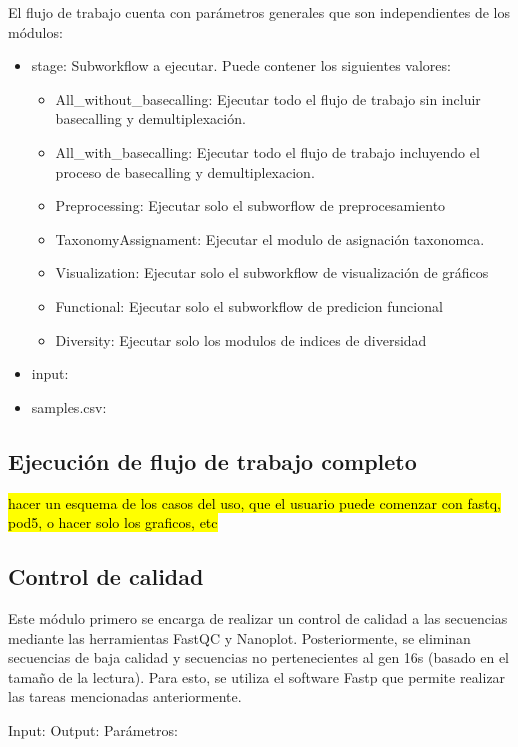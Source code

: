 El flujo de trabajo cuenta con parámetros generales que son independientes de los módulos:
\begin{itemize}
    \item stage: Subworkflow a ejecutar. Puede contener los siguientes valores:
          \begin{itemize}
              \item All\_without\_basecalling: Ejecutar todo el flujo de trabajo sin incluir basecalling y demultiplexación.
              \item All\_with\_basecalling: Ejecutar todo el flujo de trabajo incluyendo el proceso de basecalling y demultiplexacion.
              \item Preprocessing: Ejecutar solo el subworflow de preprocesamiento
              \item TaxonomyAssignament: Ejecutar el modulo de asignación taxonomca.
              \item Visualization: Ejecutar solo el subworkflow de visualización de gráficos
              \item Functional: Ejecutar solo el subworkflow de predicion funcional
              \item Diversity: Ejecutar solo los modulos de indices de diversidad

          \end{itemize}
    \item input:
    \item samples.csv:
\end{itemize}

\subsection{Ejecución de flujo de trabajo completo}
\hl{hacer un esquema de los casos del uso, que el usuario puede comenzar con fastq, pod5, o hacer solo los graficos, etc}
\subsection{Control de calidad}
Este módulo primero se encarga de realizar un control de calidad a las secuencias mediante las herramientas FastQC y Nanoplot.  Posteriormente, se eliminan secuencias de baja calidad y secuencias no pertenecientes al gen 16s (basado en el tamaño de la lectura). Para esto, se utiliza el software Fastp \cite{} que permite realizar las tareas mencionadas anteriormente.

Input:
Output:
Parámetros:


